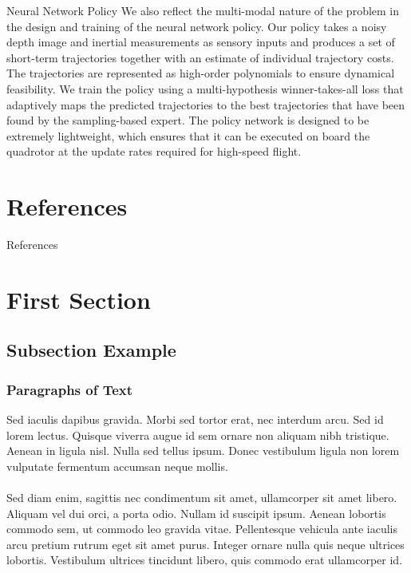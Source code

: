 \documentclass{beamer}
\begin{document}
\begin{frame}{Neural Network Policy}
	We also reflect the multi-modal nature of the problem in the design and training of the neural network policy. Our policy takes a noisy depth image and inertial measurements as sensory inputs and produces a set of short-term trajectories together with an estimate of individual trajectory costs. The trajectories are represented as high-order polynomials to ensure dynamical feasibility. We train the policy using a multi-hypothesis winner-takes-all loss that adaptively maps the predicted trajectories to the best trajectories that have been found by the sampling-based expert. The policy network is designed to be extremely lightweight, which ensures that it can be executed on board the quadrotor at the update rates required for high-speed flight.
	
\end{frame}


\section{References}
\begin{frame}{References}
	\printbibliography
\end{frame}

\section{First Section}

\subsection{Subsection Example} %

\begin{frame}
\frametitle{Paragraphs of Text}
Sed iaculis dapibus gravida. Morbi sed tortor erat, nec interdum arcu. Sed id lorem lectus. Quisque viverra augue id sem ornare non aliquam nibh tristique. Aenean in ligula nisl. Nulla sed tellus ipsum. Donec vestibulum ligula non lorem vulputate fermentum accumsan neque mollis.\\~\\

Sed diam enim, sagittis nec condimentum sit amet, ullamcorper sit amet libero. Aliquam vel dui orci, a porta odio. Nullam id suscipit ipsum. Aenean lobortis commodo sem, ut commodo leo gravida vitae. Pellentesque vehicula ante iaculis arcu pretium rutrum eget sit amet purus. Integer ornare nulla quis neque ultrices lobortis. Vestibulum ultrices tincidunt libero, quis commodo erat ullamcorper id.
\end{frame}
\end{document}
